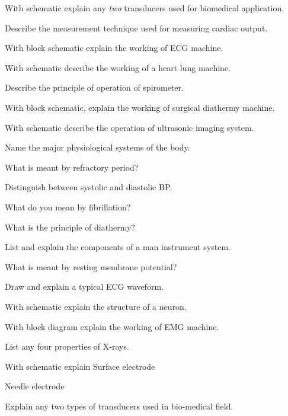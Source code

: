 \newpage\again

\item With schematic explain any \emph{two} transducers used for biomedical application.
\ene

\item \iitem Describe the measurement technique used for measuring cardiac output.
\Or
\item With block schematic explain the working of ECG machine.
\ene

\item \iitem With schematic describe the working of a heart lung machine.
\Or
\item Describe the principle of operation of spirometer.
\ene

\item \iitem With block schematic, explain the working of surgical diathermy machine.
\Or
\item With schematic describe the operation of ultrasonic imaging system.
\ene

\markC
\ene

\newpage

\sub{\subj}
\maxtime

\partA

\iitem Name the major physiological systems of the body.
\item What is meant by refractory period?
\item Distinguish between systolic and diastolic BP.
\item What do you mean by fibrillation?
\item What is the principle of diathermy?

\markA
\partB

\item List and explain the components of a man instrument system.
\item What is meant by resting membrane potential?
\item Draw and explain a typical ECG waveform.
\item With schematic explain the structure of a neuron.
\item With block diagram explain the working of EMG machine.
\item List any four properties of X-rays.

\markB

\newpage \again

\partCo

\item \iitem With schematic explain
\iitem Surface electrode \item Needle electrode
\ene
\Or
\item Explain any two types of transducers used in bio-medical field.
\ene

